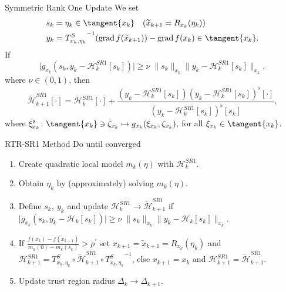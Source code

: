 \documentclass{beamer}
\begin{document}
\begin{frame}{Symmetric Rank One Update}
    We set
    \begin{align*}
        & s_k = \eta_k \in \tangent{x_k} \quad (\widetilde{x}_{k+1} = R_{x_k}(\eta_k))\\
        & y_k = {T^{S}_{x_k, \eta_k}}^{-1} ( \operatorname{grad}f(\widetilde{x}_{k+1}) ) - \operatorname{grad}f(x_k) \in \tangent{x_k}.
    \end{align*}
    If 
    \begin{equation*}
        \lvert g_{x_k}(s_k, y_k - \mathcal{H}^{SR1}_k[s_k]) \rvert \geq \nu \; \lVert s_k \rVert_{x_k} \lVert y_k - \mathcal{H}^{SR1}_k[s_k] \rVert_{x_k},
    \end{equation*}
    where $\nu \in (0,1)$, then
    \begin{equation*}
        \widetilde{\mathcal{H}}^{SR1}_{k+1} [\cdot] = \mathcal{H}^{SR1}_k [\cdot] + \frac{(y_k - \mathcal{H}^{SR1}_k [s_k]) (y_k - \mathcal{H}^{SR1}_k [s_k])^{\flat} [\cdot] }{(y_k - \mathcal{H}^{SR1}_k [s_k])^{\flat} [s_k]},
    \end{equation*}
    where $\xi^{\flat}_{x_k} \colon \tangent{x_k} \ni \zeta_{x_k} \mapsto g_{x_k}(\xi_{x_k}, \zeta_{x_k}),$ for all $\xi_{x_k} \in \tangent{x_k}$.
\end{frame}

\begin{frame}{RTR-SR1 Method}
    Do until converged
    \begin{enumerate}
        \item Create quadratic local model $m_k(\eta)$ with $\mathcal{H}^{SR1}_k$. \\[0.2\baselineskip]
        \item Obtain $\eta_k$ by (approximately) solving $m_k(\eta)$. \\[0.2\baselineskip]
        \item Define $s_k, \ y_k$ and update $\mathcal{H}^{SR1}_k \rightarrow \widetilde{\mathcal{H}}^{SR1}_{k+1}$ if $\lvert g_{x_k}(s_k, y_k - \mathcal{H}_k[s_k]) \rvert \geq \nu \; \lVert s_k \rVert_{x_k} \lVert y_k - \mathcal{H}_k[s_k] \rVert_{x_k}$. \\[0.2\baselineskip]
        \item If $\frac{f(x_k) - f(\widetilde{x}_{k+1})}{m_k(0) - m_k(s_k)} > \rho^{\prime}$ set $x_{k+1} = \widetilde{x}_{k+1} = R_{x_k}(\eta_k)$ and $\mathcal{H}^{SR1}_{k+1} = T^{S}_{x_k, \eta_k} \circ \widetilde{\mathcal{H}}^{SR1}_{k+1} \circ  {T^{S}_{x_k, \eta_k}}^{-1}$, else $x_{k+1} = x_k$ and $\mathcal{H}^{SR1}_{k+1} = \widetilde{\mathcal{H}}^{SR1}_{k+1}$.\\[0.2\baselineskip]
        \item Update trust region radius $\Delta_k \rightarrow \Delta_{k+1}$.
    \end{enumerate}
\end{frame}
\end{document}
